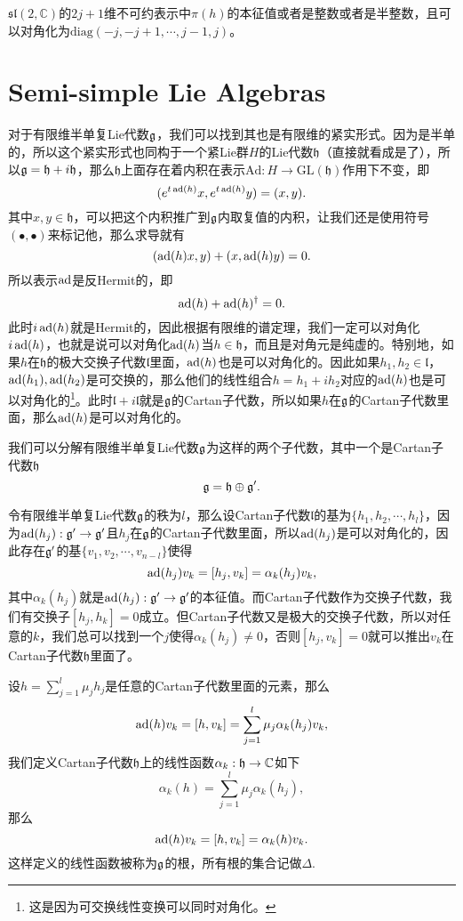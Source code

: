 \pro $\mathfrak{sl}(2,\mathbb{C})$的$2j+1$维不可约表示中$\pi(h)$的本征值或者是整数或者是半整数，且可以对角化为$\mathrm{diag}(-j,-j+1,\cdots,j-1,j)$。

\section{Semi-simple Lie Algebras}

对于有限维半单复Lie代数${\mathfrak{g}}$，我们可以找到其也是有限维的紧实形式。因为是半单的，所以这个紧实形式也同构于一个紧Lie群$H$的Lie代数$\mathfrak{h}$（直接就看成是了），所以${\mathfrak{g}}=\mathfrak{h}+i\mathfrak{h}$，那么$\mathfrak{h}$上面存在着内积在表示$\mathrm{Ad}:H\to \mathrm{GL}(\mathfrak{h})$作用下不变，即
\[
	(e^{t\operatorname{ad}(h)}x,e^{t\operatorname{ad}(h)}y)=(x,y).
\]
其中$x,y\in\mathfrak{h}$，可以把这个内积推广到${\mathfrak{g}}$内取复值的内积，让我们还是使用符号$(\bullet,\bullet)$来标记他，那么求导就有
\[
	(\operatorname{ad}(h)x,y)+(x,\operatorname{ad}(h)y)=0.
\]
所以表示$\operatorname{ad}$是反Hermit的，即
\[
	\operatorname{ad}(h)+\operatorname{ad}(h)^\dag=0.
\]
此时$i\operatorname{ad}(h)$就是Hermit的，因此根据有限维的谱定理，我们一定可以对角化$i\operatorname{ad}(h)$，也就是说可以对角化$\operatorname{ad}(h)$当$h\in \mathfrak{h}$，而且是对角元是纯虚的。特别地，如果$h$在$\mathfrak{h}$的极大交换子代数$\mathfrak{l}$里面，$\operatorname{ad}(h)$也是可以对角化的。因此如果$h_1,h_2\in\mathfrak{l}$，$\operatorname{ad}(h_1),\operatorname{ad}(h_2)$是可交换的，那么他们的线性组合$h=h_1+ih_2$对应的$\operatorname{ad}(h)$也是可以对角化的\footnote{这是因为可交换线性变换可以同时对角化。}。此时$\mathfrak{l}+i\mathfrak{l}$就是${\mathfrak{g}}$的Cartan子代数，所以如果$h$在${\mathfrak{g}}$的Cartan子代数里面，那么$\operatorname{ad}(h)$是可以对角化的。

我们可以分解有限维半单复Lie代数${\mathfrak{g}}$为这样的两个子代数，其中一个是Cartan子代数$\mathfrak{h}$
\[
	{\mathfrak{g}}=\mathfrak{h}\oplus {\mathfrak{g}}'.
\]

令有限维半单复Lie代数${\mathfrak{g}}$的秩为$l$，那么设Cartan子代数$\mathfrak{l}$的基为$\{h_1,h_2,\cdots,h_l\}$，因为$\operatorname{ad}(h_j):{\mathfrak{g}}'\to {\mathfrak{g}}'$且$h_j$在${\mathfrak{g}}$的Cartan子代数里面，所以$\operatorname{ad}(h_j)$是可以对角化的，因此存在${\mathfrak{g}}'$的基$\{v_1,v_2,\cdots,v_{n-l}\}$使得
\[
	\operatorname{ad}(h_j)v_k=[h_j,v_k]=\alpha_{k}(h_j)v_k,
\]
其中$\alpha_{k}(h_j)$就是$\operatorname{ad}(h_j):{\mathfrak{g}}'\to {\mathfrak{g}}'$的本征值。而Cartan子代数作为交换子代数，我们有交换子$[h_j,h_k]=0$成立。但Cartan子代数又是极大的交换子代数，所以对任意的$k$，我们总可以找到一个$j$使得$\alpha_{k}(h_j)\neq 0$，否则$[h_j,v_k]=0$就可以推出$v_k$在Cartan子代数$\mathfrak{h}$里面了。

设$h=\sum_{j=1}^l\mu_jh_j$是任意的Cartan子代数里面的元素，那么
\[
	\operatorname{ad}(h)v_k=[h,v_k]=\sum_{j=1}^l\mu_j\alpha_{k}(h_j)v_k,
\]
我们定义Cartan子代数$\mathfrak{h}$上的线性函数$\alpha_{k}:\mathfrak{h}\to\mathbb{C}$如下
\[
\alpha_{k}(h)=\sum_{j=1}^l\mu_j\alpha_{k}(h_j),
\]
那么
\[
	\operatorname{ad}(h)v_k=[h,v_k]=\alpha_{k}(h)v_k.
\]
这样定义的线性函数被称为${\mathfrak{g}}$的根，所有根的集合记做$\Delta$.

